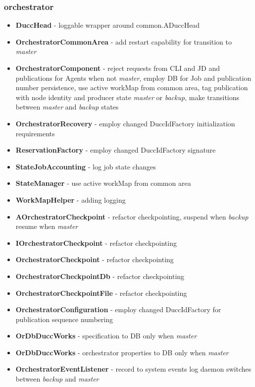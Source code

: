 \documentclass[letterpaper]{article}
\begin{document}
\subsubsection{orchestrator}

{\renewcommand\labelitemi{}
\begin{itemize}
  \item \textbf{DuccHead} - loggable wrapper around common.ADuccHead
  \item \textbf{OrchestratorCommonArea} - add restart capability for transition to {\em master}
  \item \textbf{OrchestratorComponent} - reject requests from CLI and JD and publications for Agents when not {\em master}, employ DB for Job and publication number persistence, use active workMap from common area, tag publication with node identity and producer state {\em master} or {\em backup}, make transitions between {\em master} and {\em backup} states
  \item \textbf{OrchestratorRecovery} - employ changed DuccIdFactory initialization requirements
  \item \textbf{ReservationFactory} - employ changed DuccIdFactory signature
  \item \textbf{StateJobAccounting} - log job state changes
  \item \textbf{StateManager} - use active workMap from common area
  \item \textbf{WorkMapHelper} - adding logging 
  \item \textbf{AOrchestratorCheckpoint} - refactor checkpointing, suspend when {\em backup} resume when {\em master}
  \item \textbf{IOrchestratorCheckpoint} - refactor checkpointing
  \item \textbf{OrchestratorCheckpoint} - refactor checkpointing
  \item \textbf{OrchestratorCheckpointDb} - refactor checkpointing
  \item \textbf{OrchestratorCheckpointFile} - refactor checkpointing
  \item \textbf{OrchestratorConfiguration} - employ changed DuccIdFactory for publication sequence numbering
  \item \textbf{OrDbDuccWorks} - specification to DB only when {\em master}
  \item \textbf{OrDbDuccWorks} - orchestrator properties to DB only when {\em master}
  \item \textbf{OrchestratorEventListener} - record to system events log daemon switches between {\em backup} and {\em master} 

\end{itemize}}
\end{document}
